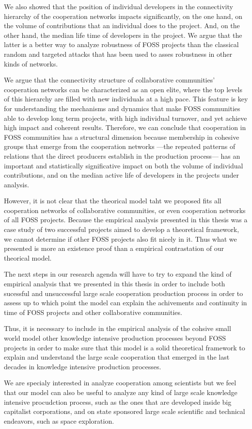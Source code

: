We also showed that the position of individual developers in the connectivity hierarchy of the cooperation networks impacts significantly, on the one hand, on the volume of contributions that an individual does to the project. And, on the other hand, the median life time of developers in the project. We argue that the latter is a better way to analyze robustness of FOSS projects than the classical random and targeted attacks that has been used to asses robustness in other kinds of networks.

We argue that the connectivity structure of collaborative communities' cooperation networks can be characterized as an open elite, where the top levels of this hierarchy are filled with new individuals at a high pace. This feature is key for understanding the mechanisms and dynamics that make FOSS communities able to develop long term projects, with high individual turnover, and yet achieve high impact and coherent results. Therefore, we can conclude that cooperation in FOSS communities has a structural dimension because membership in cohesive groups that emerge from the cooperation networks ---the repeated patterns of relations that the direct producers establish in the production process--- has an important and statistically significative impact on both the volume of individual contributions, and on the median active life of developers in the projects under analysis.

However, it is not clear that the theorical model taht we proposed fits all cooperation networks of collaborative communities, or even cooperation networks of all FOSS projects. Because the empirical analysis presented in this thesis was a case study of two successful projects aimed to develop a theoretical framework, we cannot determine if other FOSS projects also fit nicely in it. Thus what we presented is more an existence proof than a empirical contrastation of our theorical model.

The next steps in our research agenda will have to try to expand the kind of empirical analysis that we presented in this thesis in order to include both sucessful and unsuccessful large scale cooperation production process in order to assess up to which point the model can explain the achivements and continuity in time of FOSS projects and other collaborative communities.

Thus, it is necessary to include in the empirical analysis of the cohsive small world model other knowledge intensive production processes beyond FOSS projects in order to make sure that this model is a solid theoretical framework to explain and understand the large scale cooperation that emerged in the last decades in knowledge intensive production processes.

We are specialy interested in analyze cooperation among scientists but we feel that our model can also be useful to analyze any kind of large scale knowledge intensive procudction process, such as the ones that are developed inside big capitalist corporations, and on state sponsored large scale scientific and technical endeavors, such as space exploration.
